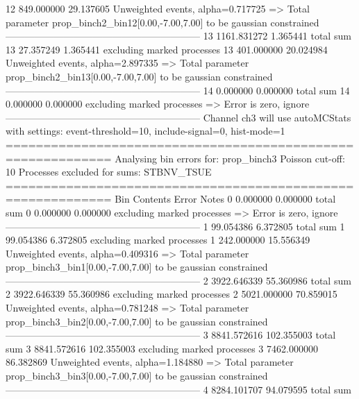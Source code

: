 12         849.000000      29.137605       Unweighted events, alpha=0.717725
  => Total parameter prop_binch2_bin12[0.00,-7.00,7.00] to be gaussian constrained
------------------------------------------------------------
13         1161.831272     1.365441        total sum                     
13         27.357249       1.365441        excluding marked processes    
13         401.000000      20.024984       Unweighted events, alpha=2.897335
  => Total parameter prop_binch2_bin13[0.00,-7.00,7.00] to be gaussian constrained
------------------------------------------------------------
14         0.000000        0.000000        total sum                     
14         0.000000        0.000000        excluding marked processes    
  => Error is zero, ignore      
------------------------------------------------------------
Channel ch3 will use autoMCStats with settings: event-threshold=10, include-signal=0, hist-mode=1
============================================================
Analysing bin errors for: prop_binch3
Poisson cut-off: 10
Processes excluded for sums: STBNV_TSUE
============================================================
Bin        Contents        Error           Notes                         
0          0.000000        0.000000        total sum                     
0          0.000000        0.000000        excluding marked processes    
  => Error is zero, ignore      
------------------------------------------------------------
1          99.054386       6.372805        total sum                     
1          99.054386       6.372805        excluding marked processes    
1          242.000000      15.556349       Unweighted events, alpha=0.409316
  => Total parameter prop_binch3_bin1[0.00,-7.00,7.00] to be gaussian constrained
------------------------------------------------------------
2          3922.646339     55.360986       total sum                     
2          3922.646339     55.360986       excluding marked processes    
2          5021.000000     70.859015       Unweighted events, alpha=0.781248
  => Total parameter prop_binch3_bin2[0.00,-7.00,7.00] to be gaussian constrained
------------------------------------------------------------
3          8841.572616     102.355003      total sum                     
3          8841.572616     102.355003      excluding marked processes    
3          7462.000000     86.382869       Unweighted events, alpha=1.184880
  => Total parameter prop_binch3_bin3[0.00,-7.00,7.00] to be gaussian constrained
------------------------------------------------------------
4          8284.101707     94.079595       total sum                     
